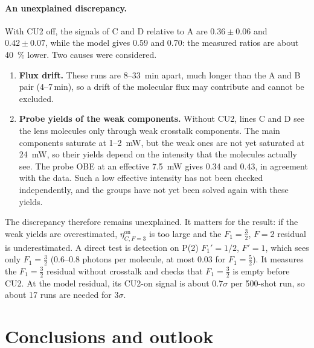 \documentclass[11pt,a4paper,oneside]{report}
\begin{document}
\paragraph{An unexplained discrepancy.} With CU2 off, the signals of C and D relative to A are
$0.36\pm0.06$ and $0.42\pm0.07$, while the model gives 0.59 and 0.70: the measured ratios are about
\SI{40}{\percent} lower. Two causes were considered.
\begin{enumerate}[itemsep=1pt]
  \item \textbf{Flux drift.} These runs are 8--\SI{33}{min} apart, much longer than the A and B pair
        (4--7\,min), so a drift of the molecular flux may contribute and cannot be excluded.
  \item \textbf{Probe yields of the weak components.} Without CU2, lines C and D see the lens
        molecules only through weak crosstalk components. The main components saturate at
        1--\SI{2}{mW}, but the weak ones are not yet saturated at \SI{24}{mW}, so their yields
        depend on the intensity that the molecules actually see. The probe OBE at an effective
        \SI{7.5}{mW} gives 0.34 and 0.43, in agreement with the data. Such a low effective
        intensity has not been checked independently, and the groups have not yet been solved
        again with these yields.
\end{enumerate}
The discrepancy therefore remains unexplained. It matters for the result: if the weak yields are
overestimated, $\eta^{\mathrm{on}}_{C,F=3}$ is too large and the $F_1=\tfrac32$, $F=2$ residual is
underestimated. A direct test is detection on P(2) $F_1'=1/2$, $F'=1$, which sees only
$F_1=\tfrac32$ (0.6--0.8 photons per molecule, at most 0.03 for $F_1=\tfrac52$). It measures the
$F_1=\tfrac32$ residual without crosstalk and checks that $F_1=\tfrac32$ is empty before CU2. At the
model residual, its CU2-on signal is about $0.7\sigma$ per 500-shot run, so about 17 runs are needed
for $3\sigma$.

\section{Conclusions and outlook}
\label{sec:conclusion}
\end{document}
